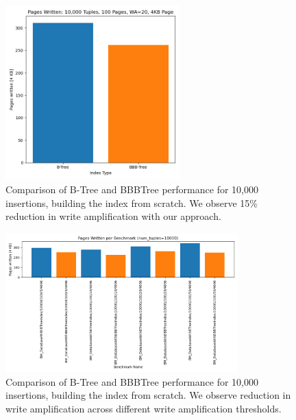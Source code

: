 \begin{figure}[htbp]
  \centering
  \includegraphics[width=0.6\textwidth]{figures/evaluation/10K_tuples_20_wa.png}
  \caption{Comparison of B-Tree and BBBTree performance for 10,000 insertions, building the index from scratch. We observe 15\% reduction in write amplification with our approach.}
  \label{fig:btree-vs-bbbtree-10000}
\end{figure}


\begin{figure}[htbp]
  \centering
  \includegraphics[width=0.8\textwidth]{figures/evaluation/10K_tuples_all_wa.png}
  \caption{Comparison of B-Tree and BBBTree performance for 10,000 insertions, building the index from scratch. We observe reduction in write amplification across different write amplification thresholds.}
  \label{fig:btree-vs-bbbtree-10000-all-wa}
\end{figure}

